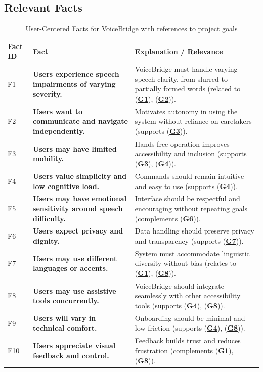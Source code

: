 \documentclass[11pt]{article}
\begin{document}
\subsection{Relevant Facts}

\begin{table}[H]
\centering
\begin{tabularx}{\textwidth}{p{1cm}p{6cm}X}
\toprule {\textbf{Fact ID}} & {\textbf{Fact}} & {\textbf{Explanation / Relevance}}\\
\midrule
F1 & \textbf{Users experience speech impairments of varying severity.} & VoiceBridge must handle varying speech clarity, from slurred to partially formed words (related to (\textbf{\hyperref[tab:project-goals]{G1}}), (\textbf{\hyperref[tab:project-goals]{G2}})). \\ \hline
F2 & \textbf{Users want to communicate and navigate independently.} & Motivates autonomy in using the system without reliance on caretakers (supports (\textbf{\hyperref[tab:project-goals]{G3}})). \\ \hline
F3 & \textbf{Users may have limited mobility.} & Hands-free operation improves accessibility and inclusion (supports (\textbf{\hyperref[tab:project-goals]{G3}}), (\textbf{\hyperref[tab:project-goals]{G4}})). \\ \hline
F4 & \textbf{Users value simplicity and low cognitive load.} & Commands should remain intuitive and easy to use (supports (\textbf{\hyperref[tab:project-goals]{G4}})). \\ \hline
F5 & \textbf{Users may have emotional sensitivity around speech difficulty.} & Interface should be respectful and encouraging without repeating goals (complements (\textbf{\hyperref[tab:project-goals]{G6}})). \\ \hline
F6 & \textbf{Users expect privacy and dignity.} & Data handling should preserve privacy and transparency (supports (\textbf{\hyperref[tab:project-goals]{G7}})). \\ \hline
F7 & \textbf{Users may use different languages or accents.} & System must accommodate linguistic diversity without bias (relates to (\textbf{\hyperref[tab:project-goals]{G1}}), (\textbf{\hyperref[tab:project-goals]{G8}})). \\ \hline
F8 & \textbf{Users may use assistive tools concurrently.} & VoiceBridge should integrate seamlessly with other accessibility tools (supports (\textbf{\hyperref[tab:project-goals]{G4}}), (\textbf{\hyperref[tab:project-goals]{G8}})). \\ \hline
F9 & \textbf{Users will vary in technical comfort.} & Onboarding should be minimal and low-friction (supports (\textbf{\hyperref[tab:project-goals]{G4}}), (\textbf{\hyperref[tab:project-goals]{G8}})). \\ \hline
F10 & \textbf{Users appreciate visual feedback and control.} & Feedback builds trust and reduces frustration (complements (\textbf{\hyperref[tab:project-goals]{G1}}), (\textbf{\hyperref[tab:project-goals]{G8}})). \\
\bottomrule
\end{tabularx}
\caption{User-Centered Facts for VoiceBridge with references to project goals}
\label{tab:user-facts}
\end{table}
\end{document}
